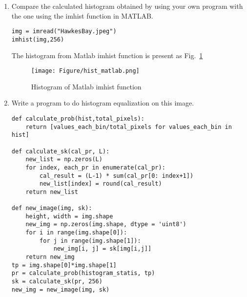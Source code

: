 \documentclass[12pt]{article}
\begin{document}
\begin{enumerate}[leftmargin=\labelsep]
\begin{enumerate}
                \item Compare the calculated histogram obtained by using your own program with the one using the imhist function in MATLAB.
\begin{lstlisting}
img = imread("HawkesBay.jpeg")
imhist(img,256)
\end{lstlisting}
                The histogram from Matlab imhist function is present as Fig.~\ref{q5_hist_matlab}
                \begin{figure}[H]
                \centering
                \texttt{[image: Figure/hist\_matlab.png]}
                \caption{Histogram of Matlab imhist function}
                \label{q5_hist_matlab}
                \end{figure}

                \item Write a program to do histogram equalization on this image.
\begin{lstlisting}
def calculate_prob(hist,total_pixels):
    return [values_each_bin/total_pixels for values_each_bin in hist]

def calculate_sk(cal_pr, L):
    new_list = np.zeros(L)
    for index, each_pr in enumerate(cal_pr):
        cal_result = (L-1) * sum(cal_pr[0: index+1])
        new_list[index] = round(cal_result)
    return new_list

def new_image(img, sk):
    height, width = img.shape
    new_img = np.zeros(img.shape, dtype = 'uint8')
    for i in range(img.shape[0]):
        for j in range(img.shape[1]):
            new_img[i, j] = sk[img[i,j]]
    return new_img
tp = img.shape[0]*img.shape[1]
pr = calculate_prob(histogram_statis, tp)
sk = calculate_sk(pr, 256)
new_img = new_image(img, sk)
\end{lstlisting}


\end{enumerate}
\end{enumerate}
\end{document}
